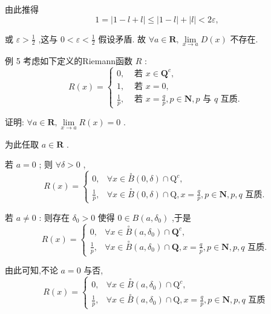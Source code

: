 由此推得
$$1 = \left| {1 - l + l}\right|  \leq  \left| {1 - l}\right|  + \left| l\right|  < {2\varepsilon },$$

或 $\varepsilon  > \frac{1}{2}$ ,这与 $0 < \varepsilon  < \frac{1}{2}$ 假设矛盾. 故 $\forall a \in  \mathbf{R},\mathop{\lim }\limits_{{x \rightarrow  a}}D\left( x\right)$ 不存在.

例 5 考虑如下定义的Riemann函数 $R$ :
$$R\left( x\right)  = \left\{  \begin{array}{ll} 0, & \text{ 若 }x \in  {\mathbf{Q}}^{c}, \\  1, & \text{ 若 }x = 0, \\  \frac{1}{p}, & \text{ 若 }x = \frac{q}{p},p \in  \mathbf{N},p\text{ 与 }q\text{ 互质. } \end{array}\right.$$

证明: $\forall a \in  \mathbf{R},\mathop{\lim }\limits_{{x \rightarrow  a}}R\left( x\right)  = 0$ .

为此任取 $a \in  \mathbf{R}$ .

若 $a = 0$ ; 则 $\forall \delta  > 0$ ,
$$R\left( x\right)  = \left\{  \begin{array}{ll} 0, & \forall x \in  \overset{ \circ  }{B}\left( {0,\delta }\right)  \cap  {\mathrm{Q}}^{c}, \\  \frac{1}{p}, & \forall x \in  \overset{ \circ  }{B}\left( {0,\delta }\right)  \cap  \mathrm{Q},x = \frac{q}{p},p \in  \mathbf{N},p,q\text{ 互质. } \end{array}\right.$$

若 $a \neq  0$ : 则存在 ${\delta }_{0} > 0$ 使得 $0 \in  B\left( {a,{\delta }_{0}}\right)$ ,于是
$$R\left( x\right)  = \left\{  \begin{array}{ll} 0, & \forall x \in  \overset{ \circ  }{B}\left( {a,{\delta }_{0}}\right)  \cap  {\mathbf{Q}}^{c}, \\  \frac{1}{p}, & \forall x \in  \overset{ \circ  }{B}\left( {a,{\delta }_{0}}\right)  \cap  \mathbf{Q},x = \frac{q}{p},p \in  \mathbf{N},p,q\text{ 互质. } \end{array}\right.$$

由此可知,不论 $a = 0$ 与否,
$$R\left( x\right)  = \left\{  \begin{array}{ll} 0, & \forall x \in  \overset{ \circ  }{B}\left( {a,{\delta }_{0}}\right)  \cap  {\mathrm{Q}}^{c}, \\  \frac{1}{p}, & \forall x \in  \overset{ \circ  }{B}\left( {a,{\delta }_{0}}\right)  \cap  \mathrm{Q},x = \frac{q}{p},p \in  \mathbf{N},p,q\text{ 互质 } \end{array}\right.$$

